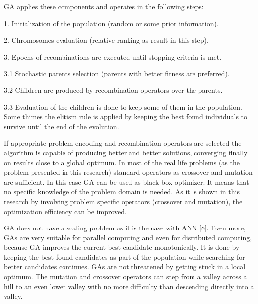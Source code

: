 \documentclass{llncs}
\begin{document}
\vspace{1 mm}

GA applies these components and operates in the following steps:

1. Initialization of the population (random or some prior information).

2. Chromosomes evaluation (relative ranking as result in this step).

3. Epochs of recombinations are executed until stopping criteria is met.

  \hspace{4 mm}3.1 Stochastic parents selection (parents with better fitness are preferred).
  
  \hspace{4 mm}3.2 Children are produced by recombination operators over the parents.
  
  \hspace{4 mm}3.3 Evaluation of the children is done to keep some of them in the population. Some thimes the elitism rule is applied by keeping the best found individuals to survive until the end of the evolution.

If appropriate problem encoding and recombination operators are selected the algorithm is capable of producing better and better solutions, converging finally on results close to a global optimum. In most of the real life problems (as the problem presented in this research) standard operators as crossover and mutation are sufficient. In this case GA can be used as black-box optimizer. It means that no specific knowledge of the problem domain is needed. As it is shown in this research by involving problem specific operators (crossover and mutation), the optimization efficiency can be improved. 

GA does not have a scaling problem as it is the case with ANN [8]. Even more, GAs are very suitable for parallel computing and even for distributed computing, because GA improves the current best candidate monotonically. It is done by keeping the best found candidates as part of the population while searching for better candidates continues. GAs are not threatened by getting stuck in a local optimum. The mutation and crossover operators can step from a valley across a hill to an even lower valley with no more difficulty than descending directly into a valley.
%
\end{document}
